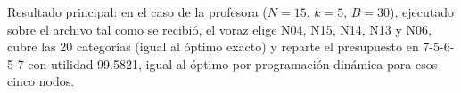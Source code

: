 \begin{clave}
Resultado principal: en el caso de la profesora ($N=15$, $k=5$, $B=30$), ejecutado sobre el archivo
tal como se recibió, el voraz elige N04, N15, N14, N13 y N06, cubre las 20 categorías (igual al
óptimo exacto) y reparte el presupuesto en 7-5-6-5-7 con utilidad 99.5821, igual al óptimo por
programación dinámica para esos cinco nodos.
\end{clave}
